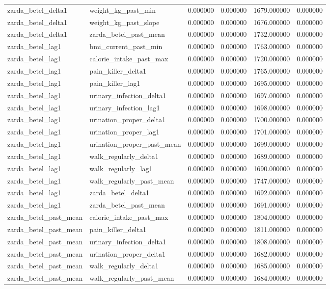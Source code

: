 \begin{longtable}{llrrrr}
zarda\_betel\_delta1 & weight\_kg\_past\_min & 0.000000 & 0.000000 & 1679.000000 & 0.000000 \\
zarda\_betel\_delta1 & weight\_kg\_past\_slope & 0.000000 & 0.000000 & 1676.000000 & 0.000000 \\
zarda\_betel\_delta1 & zarda\_betel\_past\_mean & 0.000000 & 0.000000 & 1732.000000 & 0.000000 \\
zarda\_betel\_lag1 & bmi\_current\_past\_min & 0.000000 & 0.000000 & 1763.000000 & 0.000000 \\
zarda\_betel\_lag1 & calorie\_intake\_past\_max & 0.000000 & 0.000000 & 1720.000000 & 0.000000 \\
zarda\_betel\_lag1 & pain\_killer\_delta1 & 0.000000 & 0.000000 & 1765.000000 & 0.000000 \\
zarda\_betel\_lag1 & pain\_killer\_lag1 & 0.000000 & 0.000000 & 1695.000000 & 0.000000 \\
zarda\_betel\_lag1 & urinary\_infection\_delta1 & 0.000000 & 0.000000 & 1697.000000 & 0.000000 \\
zarda\_betel\_lag1 & urinary\_infection\_lag1 & 0.000000 & 0.000000 & 1698.000000 & 0.000000 \\
zarda\_betel\_lag1 & urination\_proper\_delta1 & 0.000000 & 0.000000 & 1700.000000 & 0.000000 \\
zarda\_betel\_lag1 & urination\_proper\_lag1 & 0.000000 & 0.000000 & 1701.000000 & 0.000000 \\
zarda\_betel\_lag1 & urination\_proper\_past\_mean & 0.000000 & 0.000000 & 1699.000000 & 0.000000 \\
zarda\_betel\_lag1 & walk\_regularly\_delta1 & 0.000000 & 0.000000 & 1689.000000 & 0.000000 \\
zarda\_betel\_lag1 & walk\_regularly\_lag1 & 0.000000 & 0.000000 & 1690.000000 & 0.000000 \\
zarda\_betel\_lag1 & walk\_regularly\_past\_mean & 0.000000 & 0.000000 & 1747.000000 & 0.000000 \\
zarda\_betel\_lag1 & zarda\_betel\_delta1 & 0.000000 & 0.000000 & 1692.000000 & 0.000000 \\
zarda\_betel\_lag1 & zarda\_betel\_past\_mean & 0.000000 & 0.000000 & 1691.000000 & 0.000000 \\
zarda\_betel\_past\_mean & calorie\_intake\_past\_max & 0.000000 & 0.000000 & 1804.000000 & 0.000000 \\
zarda\_betel\_past\_mean & pain\_killer\_delta1 & 0.000000 & 0.000000 & 1811.000000 & 0.000000 \\
zarda\_betel\_past\_mean & urinary\_infection\_delta1 & 0.000000 & 0.000000 & 1808.000000 & 0.000000 \\
zarda\_betel\_past\_mean & urination\_proper\_delta1 & 0.000000 & 0.000000 & 1682.000000 & 0.000000 \\
zarda\_betel\_past\_mean & walk\_regularly\_delta1 & 0.000000 & 0.000000 & 1685.000000 & 0.000000 \\
zarda\_betel\_past\_mean & walk\_regularly\_past\_mean & 0.000000 & 0.000000 & 1684.000000 & 0.000000 \\
\end{longtable}
